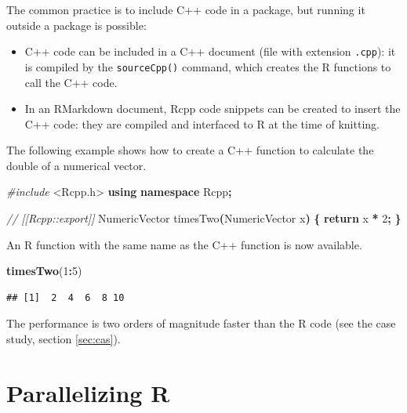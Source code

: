 \documentclass[
  12pt,
  american,
  a4paper,
  extrafontsizes,onecolumn,openright
  ]{memoir}
\newenvironment{Shaded}{\begin{snugshade}}{\end{snugshade}}
\newcommand{\CommentTok}[1]{\textcolor[rgb]{0.56,0.35,0.01}{\textit{#1}}}
\newcommand{\ControlFlowTok}[1]{\textcolor[rgb]{0.13,0.29,0.53}{\textbf{#1}}}
\newcommand{\DecValTok}[1]{\textcolor[rgb]{0.00,0.00,0.81}{#1}}
\newcommand{\FunctionTok}[1]{\textcolor[rgb]{0.13,0.29,0.53}{\textbf{#1}}}
\newcommand{\ImportTok}[1]{#1}
\newcommand{\KeywordTok}[1]{\textcolor[rgb]{0.13,0.29,0.53}{\textbf{#1}}}
\newcommand{\NormalTok}[1]{#1}
\newcommand{\OperatorTok}[1]{\textcolor[rgb]{0.81,0.36,0.00}{\textbf{#1}}}
\newcommand{\PreprocessorTok}[1]{\textcolor[rgb]{0.56,0.35,0.01}{\textit{#1}}}
\newcommand{\SpecialCharTok}[1]{\textcolor[rgb]{0.81,0.36,0.00}{\textbf{#1}}}
\providecommand{\tightlist}{%
  \setlength{\itemsep}{0pt}\setlength{\parskip}{0pt}}
\newlength{\rf}
\begin{document}
The common practice is to include C++ code in a package, but running it outside a package is possible:

\begin{itemize}
\tightlist
\item
  C++ code can be included in a C++ document (file with extension \texttt{.cpp}): it is compiled by the \texttt{sourceCpp()} command, which creates the R functions to call the C++ code.
\item
  In an RMarkdown document, Rcpp code snippets can be created to insert the C++ code: they are compiled and interfaced to R at the time of knitting.
\end{itemize}

The following example shows how to create a C++ function to calculate the double of a numerical vector.

\scriptsize

\begin{Shaded}
\begin{Highlighting}[]
\PreprocessorTok{\#include }\ImportTok{\textless{}Rcpp.h\textgreater{}}
\KeywordTok{using} \KeywordTok{namespace}\NormalTok{ Rcpp}\OperatorTok{;}

\CommentTok{// [[Rcpp::export]]}
\NormalTok{NumericVector timesTwo}\OperatorTok{(}\NormalTok{NumericVector x}\OperatorTok{)} \OperatorTok{\{}
  \ControlFlowTok{return}\NormalTok{ x }\OperatorTok{*} \DecValTok{2}\OperatorTok{;}
\OperatorTok{\}}
\end{Highlighting}
\end{Shaded}

\normalsize

An R function with the same name as the C++ function is now available.

\scriptsize

\begin{Shaded}
\begin{Highlighting}[]
\FunctionTok{timesTwo}\NormalTok{(}\DecValTok{1}\SpecialCharTok{:}\DecValTok{5}\NormalTok{)}
\end{Highlighting}
\end{Shaded}

\begin{verbatim}
## [1]  2  4  6  8 10
\end{verbatim}

\normalsize

The performance is two orders of magnitude faster than the R code (see the case study, section \ref{sec:cas}).

\section{Parallelizing R}\label{parallelizing-r}
\end{document}
